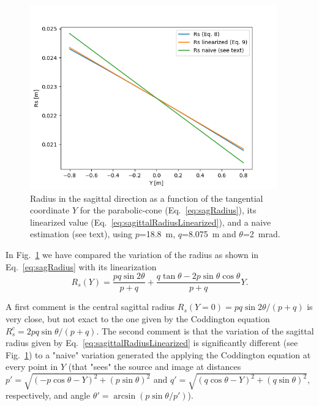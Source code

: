 \documentclass{iucr}              %
\begin{document}
\begin{figure}[h]
\centering
\includegraphics[width=0.95\textwidth]{figures/sagittalradius.png}
\caption{\label{fig:sagittalRadius}Radius in the sagittal direction as a function of the tangential coordinate $Y$ for the parabolic-cone (Eq.~\ref{eq:sagRadius}), its linearized value (Eq.~\ref{eq:sagittalRadiusLinearized}), and a naive estimation (see text), using $p$=18.8~m, $q$=8.075~m and $\theta$=2~mrad.
}
\end{figure}

In Fig.~\ref{fig:sagittalRadius} we have compared the variation of the radius as shown in Eq.~\ref{eq:sagRadius} with its linearization
\begin{equation}
\label{eq:sagittalRadiusLinearized}
R_s(Y) = \frac{p q \sin2\theta  }{p + q} + \frac{q \tan\theta - 2 p \sin\theta \cos\theta}{p + q} Y.
\end{equation}


A first comment is the central sagittal radius $R_s(Y=0)=p q \sin2\theta / (p+q)$ is very close, but not exact to the one given by the Coddington equation $R_s^c=2 p q \sin\theta / (p+q)$. The second comment is that the variation of the sagittal radius given by Eq.~\ref{eq:sagittalRadiusLinearized} is significantly different (see Fig.~\ref{fig:sagittalRadius}) to a "naive" variation generated the applying the Coddington equation at every point in $Y$ (that "sees" the source and image at distances $p'=\sqrt{(-p \cos\theta - Y)^2 + (p \sin\theta)^2}$ and $q'=\sqrt{(q \cos\theta - Y)^2 + (q \sin\theta)^2}$, respectively, and angle $\theta'=\arcsin(p \sin\theta / p')$).
\end{document}
